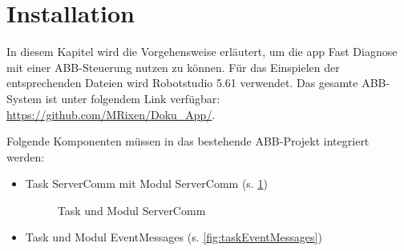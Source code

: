 \section{Installation}
\label{sec:Installation}
In diesem Kapitel wird die Vorgehensweise erläutert, um die \gls{app} Fast 
Diagnose mit einer ABB-Steuerung nutzen zu können. Für das Einspielen der 
entsprechenden Dateien wird Robotstudio 5.61 verwendet. Das gesamte ABB-System 
ist unter folgendem Link verfügbar: \url{https://github.com/MRixen/Doku_App/}.

Folgende Komponenten müssen in das bestehende ABB-Projekt 
integriert werden:
\begin{itemize}
\item Task ServerComm mit Modul ServerComm (s. \ref{fig:taskServerComm})
\begin{figure}[H]
	\centering
	\caption[Task und Modul ServerComm]{Task und Modul ServerComm}
	\label{fig:taskServerComm}
\end{figure}
\item Task und Modul EventMessages (s. \ref{fig:taskEventMessages})
\begin{figure}[H]
	\centering

\end{figure}
\end{itemize}
